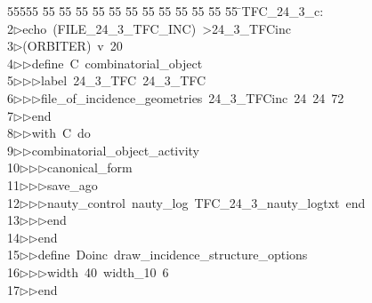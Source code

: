 %
%
\begin{tabbing}
55555 \= 55 \= 55 \= 55 \= 55 \= 55 \= 55 \= 55 \= 55 \= 55 \= 55 \= 55 \= 55 \= \>TFC\_24\_3\_c:\\[0pt]
2\>$\triangleright$\>echo\ (FILE\_24\_3\_TFC\_INC)\ {\textgreater}24\_3\_TFCinc\\[0pt]
3\>$\triangleright$\>(ORBITER)\ v\ 20\ \\[0pt]
4\>$\triangleright$\>$\triangleright$\>define\ C\ combinatorial\_object\ \\[0pt]
5\>$\triangleright$\>$\triangleright$\>$\triangleright$\>label\ 24\_3\_TFC\ 24\_3\_TFC\ \\[0pt]
6\>$\triangleright$\>$\triangleright$\>$\triangleright$\>file\_of\_incidence\_geometries\ 24\_3\_TFCinc\ 24\ 24\ 72\ \\[0pt]
7\>$\triangleright$\>$\triangleright$\>end\ \\[0pt]
8\>$\triangleright$\>$\triangleright$\>with\ C\ do\ \\[0pt]
9\>$\triangleright$\>$\triangleright$\>combinatorial\_object\_activity\ \\[0pt]
10\>$\triangleright$\>$\triangleright$\>$\triangleright$\>canonical\_form\ \\[0pt]
11\>$\triangleright$\>$\triangleright$\>$\triangleright$\>save\_ago\ \\[0pt]
12\>$\triangleright$\>$\triangleright$\>$\triangleright$\>nauty\_control\ nauty\_log\ TFC\_24\_3\_nauty\_logtxt\ end\ \\[0pt]
13\>$\triangleright$\>$\triangleright$\>$\triangleright$\>end\ \\[0pt]
14\>$\triangleright$\>$\triangleright$\>end\ \\[0pt]
15\>$\triangleright$\>$\triangleright$\>define\ Doinc\ draw\_incidence\_structure\_options\ \\[0pt]
16\>$\triangleright$\>$\triangleright$\>$\triangleright$\>width\ 40\ width\_10\ 6\ \\[0pt]
17\>$\triangleright$\>$\triangleright$\>end\ \\[0pt]

\end{tabbing}
